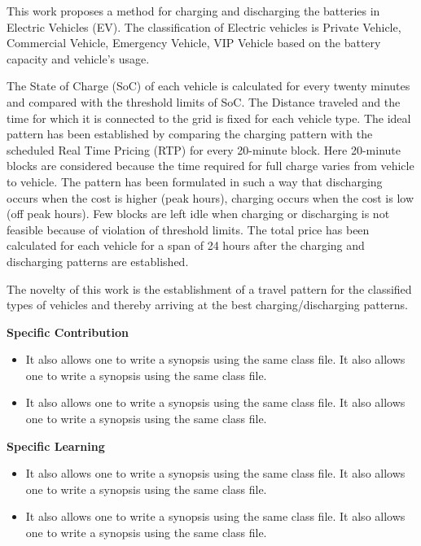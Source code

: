 \documentclass[a4paper, 12pt, oneside]{sastra}
\begin{document}
	\noindent This work proposes a method for charging and discharging the batteries in Electric Vehicles (EV). The classification of Electric vehicles is Private Vehicle, Commercial Vehicle, Emergency Vehicle, VIP Vehicle based on the battery capacity and vehicle's usage.
	
	The State of Charge (SoC) of each vehicle is calculated for every twenty minutes and compared with the threshold limits of SoC. The Distance traveled and the time for which it is connected to the grid is fixed for each vehicle type. The ideal pattern has been established by comparing the charging pattern with the scheduled Real Time Pricing (RTP) for every 20-minute block. Here 20-minute blocks are considered because the time required for full charge varies from vehicle to vehicle. The pattern has been formulated in such a way that discharging occurs when the cost is higher (peak hours), charging occurs when the cost is low (off peak hours). Few blocks are left idle when charging or discharging is not feasible because of violation of threshold limits. The total price has been calculated for each vehicle for a span of 24 hours after the charging and discharging patterns are established.
	
	The novelty of this work is the establishment of a travel pattern for the classified types of vehicles and thereby arriving at the best charging/discharging patterns.
	
	
	\noindent \textbf{Specific Contribution}
	\begin{itemize}
		\item It also allows one to write a synopsis using the same class file. It also allows one to write a synopsis using the same class file.
		\item It also allows one to write a synopsis using the same class file. It also allows one to write a synopsis using the same class file.
	\end{itemize}
	\noindent \textbf{Specific Learning}
	\begin{itemize}
		\item It also allows one to write a synopsis using the same class file. It also allows one to write a synopsis using the same class file.
		\item It also allows one to write a synopsis using the same class file. It also allows one to write a synopsis using the same class file.
	\end{itemize}
	
	\vspace*{24pt}
	
\end{document}
